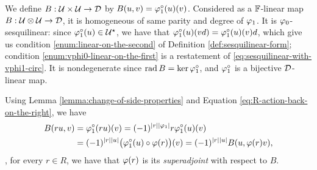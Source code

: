 \documentclass{amsbook}
\begin{document}
We define $B: \mathcal U\times \mathcal U \to \mathcal{D}$ by $B(u, v) = \varphi_1^\circ (u)(v)$. 
Considered as a $\mathbb{F}$-linear map $B: \mathcal U\otimes \mathcal U \to \mathcal{D}$, it is homogeneous of same parity and degree of $\varphi_1$. It is $\varphi_0$-sesquilinear: since $\varphi_1^\circ (u) \in \mathcal U^\star$, we have that $\varphi_1^\circ(u)(vd) = \varphi_1^\circ(u)(v)d$, which give us condition \eqref{enum:linear-on-the-second} of Definition \ref{def:sesquilinear-form};
condition \eqref{enum:vphi0-linear-on-the-first} is a restatement of \eqref{eq:sesquilinear-with-vphi1-circ}. It is nondegenerate since $\operatorname{rad} B = \ker \varphi_1^\circ$, and $\varphi_1^\circ$ is a bijective $\mathcal{D}$-linear map.





Using Lemma \ref{lemma:change-of-side-properties} and Equation \eqref{eq:R-action-back-on-the-right}, we have
%
\begin{equation*}
    \begin{split}
        B(ru,v) &= \varphi_1^\circ (ru)(v) = (-1)^{|r||\varphi_1|} r \varphi_1^\circ (u)(v)\\ &= (-1)^{|r||u|} \big(\varphi_1^\circ (u) \circ \varphi(r) \big)(v) = (-1)^{|r||u|} B(u,\varphi(r)v),
    \end{split}
\end{equation*}
\ie, for every $r\in R$, we have that $\varphi(r)$ is its \emph{superadjoint} with respect to $B$. 
\end{document}
